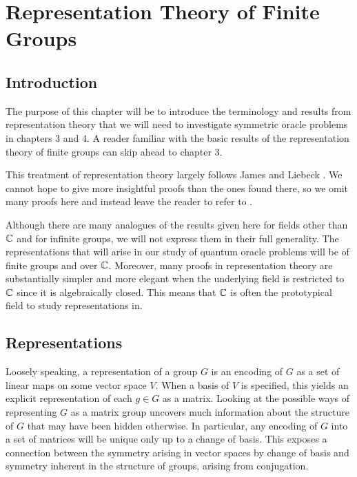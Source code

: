 
\chapter{Representation Theory of Finite Groups}

\section{Introduction}



The purpose of this chapter will be to introduce the terminology and results from representation theory that we 
will need to investigate symmetric oracle problems in chapters 3 and 4. A reader familiar with the basic results of 
the representation theory of finite groups can skip ahead to chapter 3. 

This treatment of representation theory largely follows James and Liebeck \cite{Jamies&Liebeck}. We cannot hope to 
give more insightful proofs than the ones found there, so we omit many proofs here and instead leave the reader to 
refer to \cite{James&Liebeck}.

Although there are many analogues of the results given here for fields other than $\mathbb{C}$ and for infinite groups, we 
will not express them in their full generality. The representations that will arise in our study of quantum oracle 
problems will be of finite groups and over $\mathbb{C}$. Moreover, many proofs in representation theory are substantially 
simpler and more elegant when the underlying field is restricted to $\mathbb{C}$ since it is algebraically closed. This 
means that $\mathbb{C}$ is often the prototypical field to study representations in.

\section{Representations}

Loosely speaking, a representation of a group $G$ is an encoding of $G$ as a set of linear maps on some vector 
space $V$.  When a basis of $V$ is specified, this yields an explicit representation of each $g \in G$ as a matrix.  
Looking at the possible ways of representing $G$ as a matrix group uncovers much information about the structure of 
$G$ that may have been hidden otherwise. In particular, any encoding of $G$ into a set of matrices will be unique 
only up to a change of basis. This exposes a connection between the symmetry arising in vector spaces by change of 
basis and symmetry inherent in the structure of groups, arising from conjugation.


